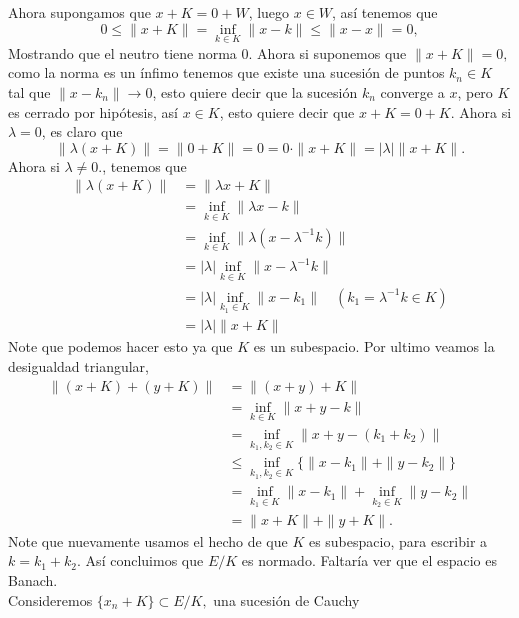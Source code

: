 \begin{itemize}
\begin{itemize}
\begin{sproof}
            Ahora supongamos que $x+K=0+W$, luego $x\in W$, así tenemos que 
            $$0\leq \|x+K\|=\inf_{k\in K}\|x-k\|\leq \|x-x\|=0,$$
            Mostrando que el neutro tiene norma $0.$ Ahora si suponemos que $\|x+K\|=0,$ como la norma es un ínfimo tenemos que existe una sucesión de puntos $k_n\in K$ tal que $\|x-k_n\|\to 0$, esto quiere decir que la sucesión $k_n$ converge a $x$, pero $K$ es cerrado por hipótesis, así $x\in K$, esto quiere decir que $x+K=0+K$. Ahora si $\lambda=0$, es claro que 
            $$\|\lambda(x+K)\|=\|0+K\|=0=0\cdot\|x+K\|=|\lambda|\|x+K\|.$$
            Ahora si $\lambda\neq 0.$, tenemos que
            \begin{align*}
                \|\lambda(x+K)\|&=\|\lambda x+K\|\\
                &=\inf_{k\in K}\|\lambda x-k\|\\
                &=\inf_{k\in K}\|\lambda(x-\lambda^{-1}k)\|\\
                &=|\lambda|\inf_{k\in K}\|x-\lambda^{-1}k\|\\
                &=|\lambda|\inf_{k_1\in K}\|x-k_1\|\quad (k_1=\lambda^{-1}k\in K)\\
                &=|\lambda|\|x+K\|
            \end{align*}
            Note que podemos hacer esto ya que $K$ es un subespacio. Por ultimo veamos la desigualdad triangular,
            \begin{align*}
                \|(x+K)+(y+K)\|&=\|(x+y)+K\|\\
                &=\inf_{k\in K}\|x+y-k\|\\
                &=\inf_{k_1,k_2\in K}\|x+y-(k_1+k_2)\|\\
                &\leq \inf_{k_1,k_2\in K}\{\|x-k_1\|+\|y-k_2\|\}\\
                &=\inf_{k_1\in K}\|x-k_1\|+\inf_{k_2\in K}\|y-k_2\|\\
                &=\|x+K\|+\|y+K\|.
            \end{align*}
            Note que nuevamente usamos el hecho de que $K$ es subespacio, para escribir a $k=k_1+k_2.$ Así concluimos que $E/K$ es normado. Faltaría ver que el espacio es Banach.\\

            Consideremos $\{x_n+K\}\subset E/K,$ una sucesión de Cauchy


\end{sproof}
\end{itemize}
\end{itemize}
